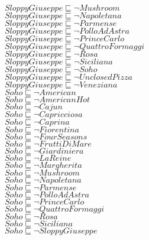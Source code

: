 \documentclass[a4paper,10pt]{article}
\begin{document}
 $SloppyGiuseppe \sqsubseteq  \lnot Mushroom$\\ 
 $SloppyGiuseppe \sqsubseteq  \lnot Napoletana$\\ 
 $SloppyGiuseppe \sqsubseteq  \lnot Parmense$\\ 
 $SloppyGiuseppe \sqsubseteq  \lnot PolloAdAstra$\\ 
 $SloppyGiuseppe \sqsubseteq  \lnot PrinceCarlo$\\ 
 $SloppyGiuseppe \sqsubseteq  \lnot QuattroFormaggi$\\ 
 $SloppyGiuseppe \sqsubseteq  \lnot Rosa$\\ 
 $SloppyGiuseppe \sqsubseteq  \lnot Siciliana$\\ 
 $SloppyGiuseppe \sqsubseteq  \lnot Soho$\\ 
 $SloppyGiuseppe \sqsubseteq  \lnot UnclosedPizza$\\ 
 $SloppyGiuseppe \sqsubseteq  \lnot Veneziana$\\ 
 $Soho \sqsubseteq  \lnot American$\\ 
 $Soho \sqsubseteq  \lnot AmericanHot$\\ 
 $Soho \sqsubseteq  \lnot Cajun$\\ 
 $Soho \sqsubseteq  \lnot Capricciosa$\\ 
 $Soho \sqsubseteq  \lnot Caprina$\\ 
 $Soho \sqsubseteq  \lnot Fiorentina$\\ 
 $Soho \sqsubseteq  \lnot FourSeasons$\\ 
 $Soho \sqsubseteq  \lnot FruttiDiMare$\\ 
 $Soho \sqsubseteq  \lnot Giardiniera$\\ 
 $Soho \sqsubseteq  \lnot LaReine$\\ 
 $Soho \sqsubseteq  \lnot Margherita$\\ 
 $Soho \sqsubseteq  \lnot Mushroom$\\ 
 $Soho \sqsubseteq  \lnot Napoletana$\\ 
 $Soho \sqsubseteq  \lnot Parmense$\\ 
 $Soho \sqsubseteq  \lnot PolloAdAstra$\\ 
 $Soho \sqsubseteq  \lnot PrinceCarlo$\\ 
 $Soho \sqsubseteq  \lnot QuattroFormaggi$\\ 
 $Soho \sqsubseteq  \lnot Rosa$\\ 
 $Soho \sqsubseteq  \lnot Siciliana$\\ 
 $Soho \sqsubseteq  \lnot SloppyGiuseppe$\\ 
\end{document}
